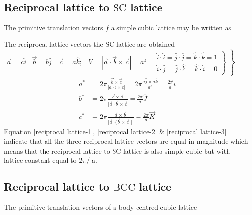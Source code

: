 \subsection{Reciprocal lattice to $\mathrm{SC}$ lattice}

The primitive translation vectors $f$ a simple cubic lattice may be written as

The reciprocal lattice vectors the $\mathrm{SC}$ lattice are obtained\\
$\left.\begin{array}{lll}
	\vec{a}=a \hat{i} & \vec{b}=b \hat{j} \quad \vec{c}=a \hat{k} ; & \left.V=|\vec{a} \cdot \vec{b} \times \vec{c}|=a^{3} \quad \begin{array}{l}
		\hat{i} \cdot \hat{i}=\hat{j} \cdot \hat{j}=\hat{k} \cdot \hat{k}=1 \\
		\hat{i} \cdot \hat{j}=\hat{j} \cdot \hat{k}=\hat{k} \cdot \hat{i}=0
	\end{array}\right\}
\end{array}\right\}$
\begin{align}
a^{*}&=2 \pi \frac{\vec{b} \times \vec{c}}{|a \cdot b \times c|}=2 \pi \frac{a \hat{j} \times a \hat{k}}{a^{3}}=\frac{2 \pi}{a} \hat{i} \label{reciprocal lattice-1}\\
b^{*}&=2 \pi \frac{\vec{c} \times \vec{a}}{|\vec{a} \cdot \vec{b} \times \vec{c}}=\frac{2 \pi}{a} \hat{J}\label{reciprocal lattice-2} \\
c^{*}&=2 \pi \frac{\vec{a} \times \vec{b}}{\mid \vec{a} \cdot(\vec{b} \times \vec{c} \mid}=\frac{2 \pi}{a} \vec{K} \label{reciprocal lattice-3}
\end{align}
Equation \ref{reciprocal lattice-1}, \ref{reciprocal lattice-2} \& \ref{reciprocal lattice-3} indicate that all the three reciprocal lattice vectors are equal in magnitude which means that the reciprocal lattice to SC lattice is also simple cubic but with lattice constant equal to $2 \pi /$ a.

\subsection{Reciprocal lattice to $\mathrm{BCC}$ lattice}

The primitive translation vectors of a body centred cubic lattice


